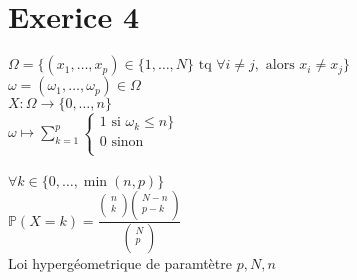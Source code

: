 \documentclass{article}
\author{Frederic Becerril}
\begin{document}
\part*{Exerice 4}

$\Omega = \{(x_1, \dots, x_p) \in \{1, \dots, N\} \mbox{ tq } \forall i \neq j, \mbox{ alors } x_i \neq x_j\}$\\
$\omega = (\omega_1, \dots, \omega_p) \in \Omega$\\
$X : \Omega \rightarrow \{0, \dots, n\}$\\
$\omega \mapsto \sum_{k = 1}^p  \left\{
    \begin{array}{ll}
        1 \mbox{ si } \omega_k \leq n\}\\
        0 \mbox{ sinon }\\
    \end{array}
\right.$\\
\\
$\forall k \in \{0, \dots, \min(n, p)\}$\\
$\mathbb{P}(X = k) = \frac{\begin{pmatrix}
    n\\
    k\\
\end{pmatrix} \begin{pmatrix}
    N - n\\
    p - k\\
\end{pmatrix}}{\begin{pmatrix}
    N\\
    p\\
\end{pmatrix}}$\\
Loi hypergéometrique de paramtètre $p, N, n$
\end{document}
